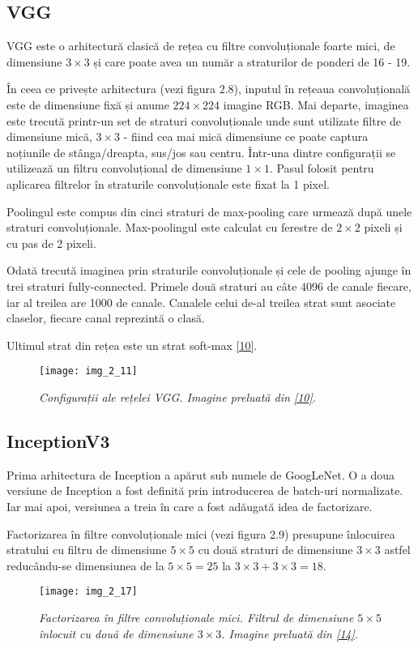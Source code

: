 \subsection{VGG}

VGG este o arhitectură clasică de rețea cu filtre convoluționale foarte mici, de dimensiune $3 \times 3$ și care poate avea un număr a straturilor de ponderi de 16 - 19. 

În ceea ce privește arhitectura (vezi figura 2.8), inputul în rețeaua convoluțională este de dimensiune fixă și anume $224 \times 224$ imagine RGB. Mai departe, imaginea este trecută printr-un set de straturi convoluționale unde sunt utilizate filtre de dimensiune mică, $3 \times 3$ - fiind cea mai mică dimensiune ce poate captura noțiunile de stânga/dreapta, sus/jos sau centru. Într-una dintre configurații se utilizează un filtru convoluțional de dimensiune $1 \times 1$. Pasul folosit pentru aplicarea filtrelor în straturile convoluționale este fixat la 1 pixel.

Poolingul este compus din cinci straturi de max-pooling care urmează după unele straturi convoluționale. Max-poolingul este calculat cu ferestre de $2\times2$ pixeli și cu pas de 2 pixeli.

Odată trecută imaginea prin straturile convoluționale și cele de pooling ajunge în trei straturi fully-connected. Primele două straturi au câte 4096 de canale fiecare, iar al treilea are 1000 de canale. Canalele celui de-al treilea strat sunt asociate claselor, fiecare canal reprezintă o clasă.

Ultimul strat din rețea este un strat soft-max \hyperlink{SimonyanKarenZissermanAndrew}{[10]}.

\begin{figure}[!h]
	\centering
	\texttt{[image: img\_2\_11]}
	\caption[Configurații VGG]{\textit{Configurații ale rețelei VGG. Imagine preluată din \hyperlink{SimonyanKarenZissermanAndrew}{[10]}.}}
\end{figure}   

\subsection{InceptionV3}
Prima arhitectura de Inception a apărut sub numele de GoogLeNet. O a doua versiune de Inception a fost definită prin introducerea de batch-uri normalizate. Iar mai apoi, versiunea a treia în care a fost adăugată idea de factorizare.

Factorizarea în filtre convoluționale mici (vezi figura 2.9) presupune înlocuirea stratului cu filtru de dimensiune $5 \times 5$ cu două straturi de dimensiune $3 \times 3$ astfel reducându-se dimensiunea de la $5 \times 5 = 25$ la $3 \times 3 + 3 \times 3 = 18$.
\begin{figure}[!h]
	\centering
	\texttt{[image: img\_2\_17]}
	\caption[Factorizarea în filtre convoluționale mici]{\textit{Factorizarea în filtre convoluționale mici. Filtrul de dimensiune $5 \times 5$ înlocuit cu două de dimensiune $3 \times 3$. Imagine preluată din \hyperlink{guideinceptionv3}{[14]}.}}
\end{figure}   

